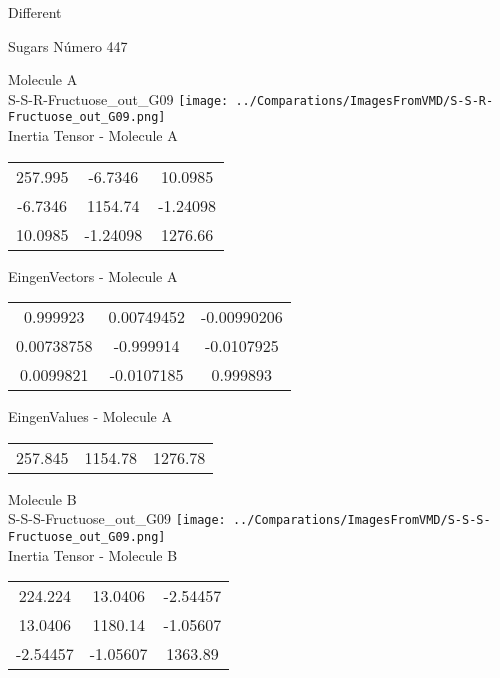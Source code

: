 \begin{center}
\vtab
\vtab
\textcolor{NavyBlue}{\Large Different}
\end{center}

 \newpage

\vtab[-2cm]
\begin{center}
{\large Sugars \tab Número 447}
\end{center}
\begin{multicols}{2}
\begin{center}

Molecule A \\ 
S-S-R-Fructuose\_out\_G09
\texttt{[image: ../Comparations/ImagesFromVMD/S-S-R-Fructuose\_out\_G09.png]}
\\
Inertia Tensor - Molecule A \\
\vtab

\begin{tabular}{|c c c|}
257.995	 & 	-6.7346	 & 	10.0985	 \\
-6.7346	 & 	1154.74	 & 	-1.24098	 \\
10.0985	 & 	-1.24098	 & 	1276.66
\end{tabular}

\vtab
 EingenVectors - Molecule A     \\
\vtab
\begin{tabular}{|c c c|}
0.999923	 & 	0.00749452	 & 	-0.00990206	 \\
0.00738758	 & 	-0.999914	 & 	-0.0107925	 \\
0.0099821	 & 	-0.0107185	 & 	0.999893
\end{tabular}

\vtab
 EingenValues - Molecule A     \\
\vtab
\begin{tabular}{|c c c|}
257.845	 & 	1154.78	 & 	1276.78	 \\
\end{tabular}
\columnbreak

Molecule B \\ 
S-S-S-Fructuose\_out\_G09
\texttt{[image: ../Comparations/ImagesFromVMD/S-S-S-Fructuose\_out\_G09.png]}
\\
Inertia Tensor - Molecule B \\
\vtab

\begin{tabular}{|c c c|}
224.224	 & 	13.0406	 & 	-2.54457	 \\
13.0406	 & 	1180.14	 & 	-1.05607	 \\
-2.54457	 & 	-1.05607	 & 	1363.89
\end{tabular}


\end{center}
\end{multicols}
